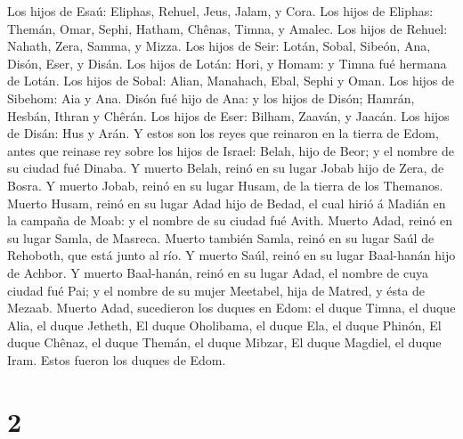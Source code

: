  Los hijos de Esaú: Eliphas, Rehuel, Jeus, Jalam, y Cora.
 Los hijos de Eliphas: Themán, Omar, Sephi, Hatham,
Chênas, Timna, y Amalec.  Los hijos de Rehuel: Nahath,
Zera, Samma, y Mizza.  Los hijos de Seir: Lotán, Sobal,
Sibeón, Ana, Disón, Eser, y Disán.  Los hijos de Lotán:
Hori, y Homam: y Timna fué hermana de Lotán.  Los hijos
de Sobal: Alian, Manahach, Ebal, Sephi y Oman. Los hijos de Sibehom: Aia
y Ana.  Disón fué hijo de Ana: y los hijos de Disón;
Hamrán, Hesbán, Ithran y Chêrán.  Los hijos de Eser:
Bilham, Zaaván, y Jaacán. Los hijos de Disán: Hus y Arán.
 Y estos son los reyes que reinaron en la tierra de Edom,
antes que reinase rey sobre los hijos de Israel: Belah, hijo de Beor; y
el nombre de su ciudad fué Dinaba.  Y muerto Belah, reinó
en su lugar Jobab hijo de Zera, de Bosra.  Y muerto
Jobab, reinó en su lugar Husam, de la tierra de los Themanos.
 Muerto Husam, reinó en su lugar Adad hijo de Bedad, el
cual hirió á Madián en la campaña de Moab: y el nombre de su ciudad fué
Avith.  Muerto Adad, reinó en su lugar Samla, de Masreca.
 Muerto también Samla, reinó en su lugar Saúl de
Rehoboth, que está junto al río.  Y muerto Saúl, reinó en
su lugar Baal-hanán hijo de Achbor.  Y muerto Baal-hanán,
reinó en su lugar Adad, el nombre de cuya ciudad fué Pai; y el nombre de
su mujer Meetabel, hija de Matred, y ésta de Mezaab. 
Muerto Adad, sucedieron los duques en Edom: el duque Timna, el duque
Alia, el duque Jetheth,  El duque Oholibama, el duque
Ela, el duque Phinón,  El duque Chênaz, el duque Themán,
el duque Mibzar,  El duque Magdiel, el duque Iram. Estos
fueron los duques de Edom.

\hypertarget{section-1}{%
\section{2}\label{section-1}}

